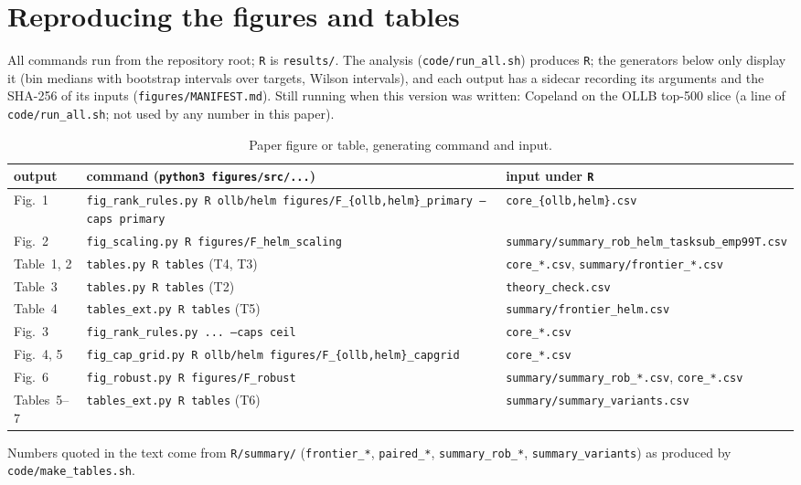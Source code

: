 \documentclass{article}
\begin{document}
\section{Reproducing the figures and tables}
\label{app:repro}
All commands run from the repository root; \texttt{R} is \texttt{results/}. The analysis (\texttt{code/run\_all.sh}) produces \texttt{R}; the generators below only display it (bin medians with bootstrap intervals over targets, Wilson intervals), and each output has a sidecar recording its arguments and the SHA-256 of its inputs (\texttt{figures/MANIFEST.md}). Still running when this version was written: Copeland on the OLLB top-500 slice (a line of \texttt{code/run\_all.sh}; not used by any number in this paper).
\begin{table}[h]
\caption{Paper figure or table, generating command and input.}
\label{tab:repro}
\centering\scriptsize
\begin{tabular}{@{}lll@{}}
\toprule
output & command (\texttt{python3 figures/src/...}) & input under \texttt{R} \\
\midrule
Fig.~1 & \texttt{fig\_rank\_rules.py R ollb/helm figures/F\_\{ollb,helm\}\_primary --caps primary} & \texttt{core\_\{ollb,helm\}.csv} \\
Fig.~2 & \texttt{fig\_scaling.py R figures/F\_helm\_scaling} & \texttt{summary/summary\_rob\_helm\_tasksub\_emp99T.csv} \\
Table~1, 2 & \texttt{tables.py R tables} (T4, T3) & \texttt{core\_*.csv}, \texttt{summary/frontier\_*.csv} \\
Table~3 & \texttt{tables.py R tables} (T2) & \texttt{theory\_check.csv} \\
Table~4 & \texttt{tables\_ext.py R tables} (T5) & \texttt{summary/frontier\_helm.csv} \\
Fig.~3 & \texttt{fig\_rank\_rules.py ... --caps ceil} & \texttt{core\_*.csv} \\
Fig.~4, 5 & \texttt{fig\_cap\_grid.py R ollb/helm figures/F\_\{ollb,helm\}\_capgrid} & \texttt{core\_*.csv} \\
Fig.~6 & \texttt{fig\_robust.py R figures/F\_robust} & \texttt{summary/summary\_rob\_*.csv}, \texttt{core\_*.csv} \\
Tables~5--7 & \texttt{tables\_ext.py R tables} (T6) & \texttt{summary/summary\_variants.csv} \\
\bottomrule
\end{tabular}
\end{table}
Numbers quoted in the text come from \texttt{R/summary/} (\texttt{frontier\_*}, \texttt{paired\_*}, \texttt{summary\_rob\_*}, \texttt{summary\_variants}) as produced by \texttt{code/make\_tables.sh}.
\end{document}

